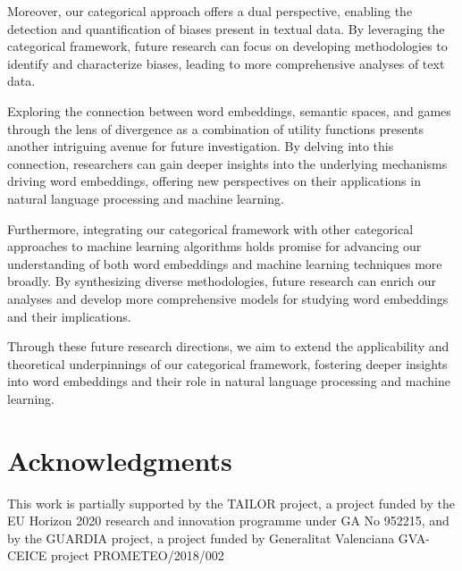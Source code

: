 \documentclass[10pt,a4paper]{elsarticle}
\begin{document}
Moreover, our categorical approach offers a dual perspective, enabling the detection and quantification of biases present in textual data. By leveraging the categorical framework, future research can focus on developing methodologies to identify and characterize biases, leading to more comprehensive analyses of text data.

Exploring the connection between word embeddings, semantic spaces, and games through the lens of divergence as a combination of utility functions presents another intriguing avenue for future investigation. By delving into this connection, researchers can gain deeper insights into the underlying mechanisms driving word embeddings, offering new perspectives on their applications in natural language processing and machine learning.

Furthermore, integrating our categorical framework with other categorical approaches to machine learning algorithms holds promise for advancing our understanding of both word embeddings and machine learning techniques more broadly. By synthesizing diverse methodologies, future research can enrich our analyses and develop more comprehensive models for studying word embeddings and their implications.

Through these future research directions, we aim to extend the applicability and theoretical underpinnings of our categorical framework, fostering deeper insights into word embeddings and their role in natural language processing and machine learning.

\section{Acknowledgments}\label{sec:Ack}
	This work is partially supported by the TAILOR project, a project funded by the EU Horizon 2020 research and innovation programme under GA No 952215, and by the GUARDIA project, a project funded by Generalitat Valenciana GVA-CEICE project PROMETEO/2018/002
\end{document}
